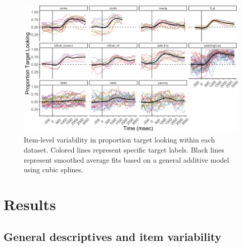 \documentclass[10pt, letterpaper]{article}
\newenvironment{CodeChunk}{}{}
\begin{document}
\begin{CodeChunk}
\begin{figure}[h]

{\centering \includegraphics{figs/peekbank_item_vis-1} 

}

\caption[Item-level variability in proportion target looking within each dataset]{Item-level variability in proportion target looking within each dataset. Colored lines represent specific target labels. Black lines represent smoothed average fits based on a general additive model using cubic splines.}\label{fig:peekbank_item_vis}
\end{figure}
\end{CodeChunk}

\hypertarget{results}{%
\section{Results}\label{results}}

\hypertarget{general-descriptives-and-item-variability}{%
\subsection{General descriptives and item
variability}\label{general-descriptives-and-item-variability}}
\end{document}
